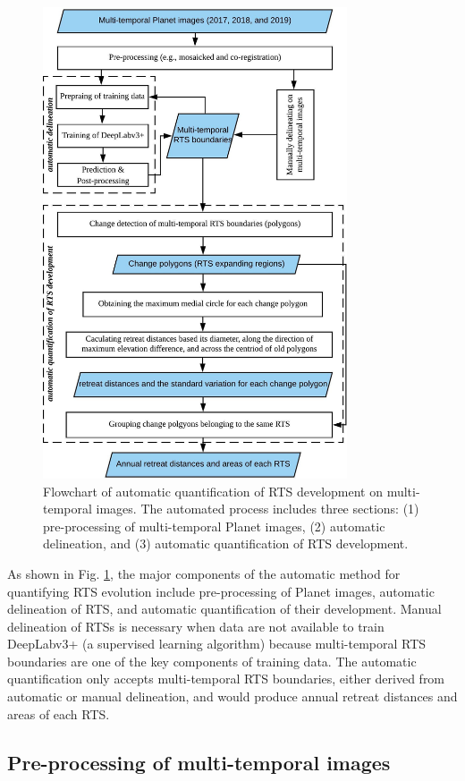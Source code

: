 \documentclass[authoryear,preprint,review,12pt]{elsarticle}
\begin{document}
\begin{figure}
	\centering
	\includegraphics[width=9cm]{figs/polygon_based_change_detection_flowchart.jpg}
	\caption{Flowchart of automatic quantification of RTS development on multi-temporal images. The automated process includes three sections: (1) pre-processing of multi-temporal Planet images, (2) automatic delineation, and (3) automatic quantification of RTS development.}
	\label{fig_flowchart}
\end{figure}

 As shown in Fig. \ref{fig_flowchart}, the major components of the automatic method for quantifying RTS evolution include pre-processing of Planet images, automatic delineation of RTS, and automatic quantification of their development. 
Manual delineation of RTSs is necessary when data are not available to train DeepLabv3+ (a supervised learning algorithm) because multi-temporal RTS boundaries are one of the key components of training data.
The automatic quantification only accepts multi-temporal RTS boundaries, either derived from automatic or manual delineation, and would produce annual retreat distances and areas of each RTS. 


\subsection{Pre-processing of multi-temporal images}
\label{sec_preprocessing}
\end{document}
